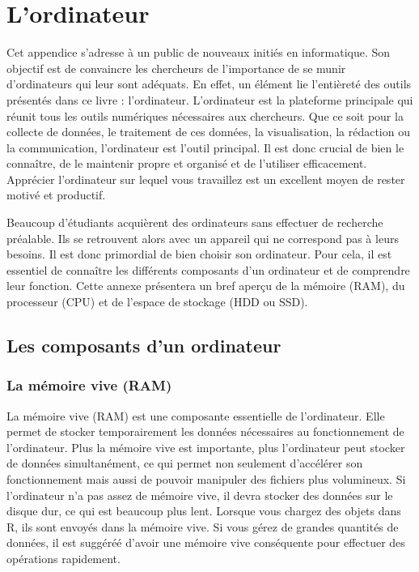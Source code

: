 \documentclass[
  letterpaper,
  DIV=11,
  numbers=noendperiod]{scrreprt}
\begin{document}

\chapter{L'ordinateur}\label{lordinateur}

Cet appendice s'adresse à un public de nouveaux initiés en informatique.
Son objectif est de convaincre les chercheurs de l'importance de se
munir d'ordinateurs qui leur sont adéquats. En effet, un élément lie
l'entièreté des outils présentés dans ce livre : l'ordinateur.
L'ordinateur est la plateforme principale qui réunit tous les outils
numériques nécessaires aux chercheurs. Que ce soit pour la collecte de
données, le traitement de ces données, la visualisation, la rédaction ou
la communication, l'ordinateur est l'outil principal. Il est donc
crucial de bien le connaître, de le maintenir propre et organisé et de
l'utiliser efficacement. Apprécier l'ordinateur sur lequel vous
travaillez est un excellent moyen de rester motivé et productif.

Beaucoup d'étudiants acquièrent des ordinateurs sans effectuer de
recherche préalable. Ils se retrouvent alors avec un appareil qui ne
correspond pas à leurs besoins. Il est donc primordial de bien choisir
son ordinateur. Pour cela, il est essentiel de connaître les différents
composants d'un ordinateur et de comprendre leur fonction. Cette annexe
présentera un bref aperçu de la mémoire (RAM), du processeur (CPU) et de
l'espace de stockage (HDD ou SSD).

\section{Les composants d'un
ordinateur}\label{les-composants-dun-ordinateur}

\subsection{La mémoire vive (RAM)}\label{la-muxe9moire-vive-ram}

La mémoire vive (RAM) est une composante essentielle de l'ordinateur.
Elle permet de stocker temporairement les données nécessaires au
fonctionnement de l'ordinateur. Plus la mémoire vive est importante,
plus l'ordinateur peut stocker de données simultanément, ce qui permet
non seulement d'accélérer son fonctionnement mais aussi de pouvoir
manipuler des fichiers plus volumineux. Si l'ordinateur n'a pas assez de
mémoire vive, il devra stocker des données sur le disque dur, ce qui est
beaucoup plus lent. Lorsque vous chargez des objets dans R, ils sont
envoyés dans la mémoire vive. Si vous gérez de grandes quantités de
données, il est suggéréé d'avoir une mémoire vive conséquente pour
effectuer des opérations rapidement.
\end{document}
